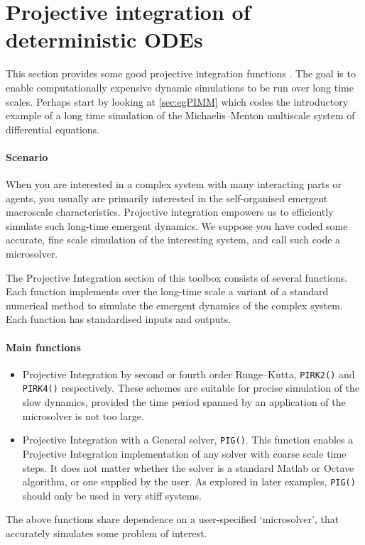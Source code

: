 \section{Projective integration of deterministic ODEs}
\label{sec:ProjInt}
\localtableofcontents

This section provides some good projective integration functions \cite[e.g.]{Gear02b, Gear03c, Givon06}.
The goal is to enable computationally expensive dynamic simulations to be run over long time scales.
Perhaps start by looking at \cref{sec:egPIMM} which codes the introductory example of a long time simulation of the Michaelis--Menton multiscale system of differential equations.

\paragraph{Scenario}
When you are interested in a complex system with many interacting parts or agents, you usually are primarily interested in the self-organised emergent macroscale characteristics.
Projective integration empowers us to efficiently simulate such long-time emergent dynamics.
We suppose you have coded some accurate, fine scale simulation of the interesting system, and call such code a microsolver.

The Projective Integration section of this toolbox consists of several functions.
Each function implements over the long-time scale a variant of a standard numerical method to simulate the emergent dynamics of the complex system.
Each function has standardised inputs and outputs.

\paragraph{Main functions}
\begin{itemize}
\item Projective Integration by second or fourth order Runge--Kutta, \verb|PIRK2()| and \verb|PIRK4()| respectively.
These schemes are suitable for precise simulation of the slow dynamics, provided the time period spanned by an application of the microsolver is not too large.
\item Projective Integration with a General solver, \verb|PIG()|.
This function enables a Projective Integration implementation of any solver with coarse scale time steps.
It does not matter whether the solver is a standard Matlab or Octave algorithm, or one supplied by the user.
As explored in later examples, \verb|PIG()| should only be used in very stiff systems. 
\end{itemize}
The above functions share dependence on a user-specified `microsolver', that accurately simulates some problem of interest. 
